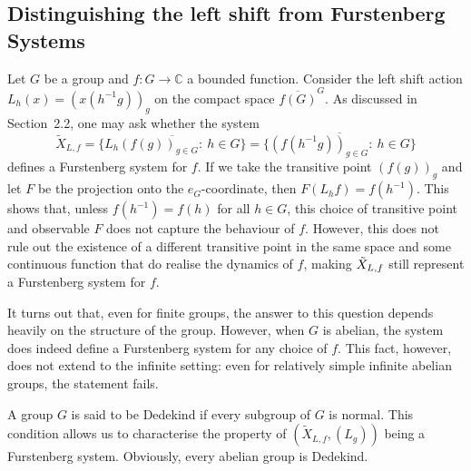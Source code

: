 \documentclass{amsart}
\numberwithin{equation}{section}
\theoremstyle{definition}
\theoremstyle{plain}
\begin{document}
\subsection{Distinguishing the left shift from Furstenberg Systems}\label{sec:left_shifts}
Let $G$ be a group and $f \colon G \to \mathbb{C}$ a bounded function. Consider the left shift action $L_h(x) = (x(h^{-1}g))_g$ on the compact space $\overline{f(G)}^G$. As discussed in Section~2.2, one may ask whether the system
\begin{equation} \widetilde{X}_{L,f}=\overline{\Big\{L_h(f(g))_{g\in G}:\ h\in G\Big\}}=\overline{\Big\{(f(h^{-1}g))_{g\in G}:\ h\in G\Big\}}\end{equation}
defines a Furstenberg system for $f$. If we take the transitive point $(f(g))_g$ and let $F$ be the projection onto the $e_G$-coordinate, then $F(L_h f) = f(h^{-1})$. This shows that, unless $f(h^{-1}) = f(h)$ for all $h \in G$, this choice of transitive point and observable $F$ does not capture the behaviour of $f$. However, this does not rule out the existence of a different transitive point in the same space and some continuous function that do realise the dynamics of $f$, making $\Tilde{X}_{L,f}$ still represent a Furstenberg system for $f$.

It turns out that, even for finite groups, the answer to 
this question depends heavily on the structure of the 
group. However, when $G$ is abelian, the system does indeed 
define a Furstenberg system for any choice of $f$. This 
fact, however, does not extend to the infinite 
setting: even for relatively simple infinite abelian 
groups, the statement fails.

A group $G$ is said to be Dedekind if every subgroup of $G$ 
is normal. This condition allows us to characterise the 
property of $(\widetilde{X}_{L,f},(L_g))$ being a 
Furstenberg system. Obviously, every abelian group is 
Dedekind.
\end{document}
